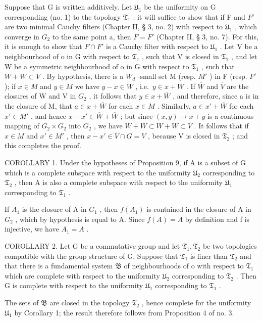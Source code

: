 Suppose that G is written additively. Let \(\mathfrak{U}_{1}\) be the uniformity on G corresponding (no. 1) to the topology \(\mathfrak{T}_{1}\) : it will suffice to show that if F and \(F'\) are two minimal Cauchy filters (Chapter II, § 3, no. 2) with respect to \(\mathfrak{U}_{1}\) , which converge in \(G_{2}\) to the same point a, then \(F = F'\) (Chapter II, § 3, no. 7). For this, it is enough to show that \(F \cap F'\) is a Cauchy filter with respect to \(\mathfrak{U}_{1}\) . Let V be a neighbourhood of o in G with respect to \(\mathfrak{T}_{1}\) , such that V is closed in \(\mathfrak{T}_{2}\) , and let W be a symmetric neighbourhood of o in G with respect to \(\mathfrak{T}_{1}\) , such that \(W + W \subset V\) . By hypothesis, there is a \(W_{d}\) -small set M (resp. \(M'\) ) in F (resp. \(F'\) ); if \(x \in M\) and \(y \in M\) we have \(y - x \in W\) , i.e.~\(y \in x + W\) . If \(\overline{W}\) and \(\overline{V}\) are the closures of W and V in \(G_{2}\) , it follows that \(y \in x + \overline{W}\) , and therefore, since a is in the closure of M, that \(a \in x + \overline{W}\) for each \(x \in M\) . Similarly, \(a \in x' + \overline{W}\) for each \(x' \in M'\) , and hence \(x - x' \in \overline{W} + \overline{W}\) ; but since \((x, y) \to x + y\) is a continuous mapping of \(G_{2} \times G_{2}\) into \(G_{2}\) , we have \(\overline{W} + \overline{W} \subset \overline{W + W} \subset \overline{V}\) . It follows that if \(x \in M\) and \(x' \in M'\) , then \(x - x' \in \overline{V} \cap G = V\) , because V is closed in \(\mathfrak{T}_{2}\) ; and this completes the proof.

COROLLARY 1. Under the hypotheses of Proposition 9, if A is a subset of G which is a complete subspace with respect to the uniformity \(\mathfrak{U}_{2}\) corresponding to \(\mathfrak{T}_{2}\) , then A is also a complete subspace with respect to the uniformity \(\mathfrak{U}_{1}\) corresponding to \(\mathfrak{T}_{1}\) .

If \(A_{1}\) is the closure of A in \(G_{1}\) , then \(f(A_{1})\) is contained in the closure of A in \(G_{2}\) , which by hypothesis is equal to A. Since \(f(A)=A\) by definition and f is injective, we have \(A_{1}=A\) .

COROLLARY 2. Let G be a commutative group and let \(\mathfrak{T}_1, \mathfrak{T}_2\) be two topologies compatible with the group structure of G. Suppose that \(\mathfrak{T}_1\) is finer than \(\mathfrak{T}_2\) and that there is a fundamental system \(\mathfrak{B}\) of neighbourhoods of o with respect to \(\mathfrak{T}_1\) which are complete with respect to the uniformity \(\mathfrak{U}_2\) corresponding to \(\mathfrak{T}_2\) . Then G is complete with respect to the uniformity \(\mathfrak{U}_1\) corresponding to \(\mathfrak{T}_1\) .

The sets of \(\mathfrak{B}\) are closed in the topology \(\mathfrak{T}_{2}\) , hence complete for the uniformity \(\mathfrak{U}_{1}\) by Corollary 1; the result therefore follows from Proposition 4 of no. 3.


